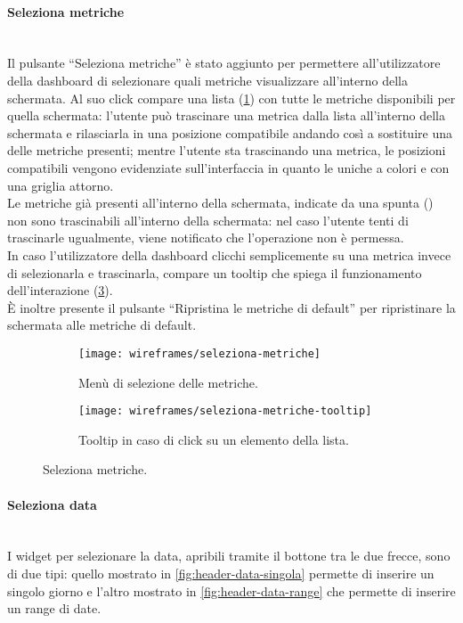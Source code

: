 \documentclass[../../../main.tex]{subfiles}
\begin{document}
\paragraph{Seleziona metriche}\mbox{}\\
Il pulsante ``Seleziona metriche'' è stato aggiunto per permettere all'utilizzatore della dashboard di selezionare quali metriche visualizzare all'interno della schermata. Al suo click compare una lista (\ref{fig:seleziona-metriche}) con tutte le metriche disponibili per quella schermata: l'utente può trascinare una metrica dalla lista all'interno della schermata e rilasciarla in una posizione compatibile andando così a sostituire una delle metriche presenti; mentre l'utente sta trascinando una metrica, le posizioni compatibili vengono evidenziate sull'interfaccia in quanto le uniche a colori e con una griglia attorno.\\
Le metriche già presenti all'interno della schermata, indicate da una spunta (\checkmark) non sono trascinabili all'interno della schermata: nel caso l'utente tenti di trascinarle ugualmente, viene notificato che l'operazione non è permessa.\\
In caso l'utilizzatore della dashboard clicchi semplicemente su una metrica invece di selezionarla e trascinarla, compare un tooltip che spiega il funzionamento dell'interazione (\ref{fig:seleziona-metriche-tooltip}).\\
\`E inoltre presente il pulsante ``Ripristina le metriche di default'' per ripristinare la schermata alle metriche di default.

\begin{figure}[H]
    \begin{subfigure}[b]{0.5\textwidth}
        \centering
        \texttt{[image: wireframes/seleziona-metriche]}
        \caption{Menù di selezione delle metriche.}
        \label{fig:seleziona-metriche}
    \end{subfigure}
\hfill
    \begin{subfigure}[b]{0.5\textwidth}
        \centering
        \texttt{[image: wireframes/seleziona-metriche-tooltip]}
        \caption{Tooltip in caso di click su un elemento della lista.}
        \label{fig:seleziona-metriche-tooltip}
    \end{subfigure}
    \caption{Seleziona metriche.}
\end{figure}


\paragraph{Seleziona data}\mbox{}\\
I widget per selezionare la data, apribili tramite il bottone tra le due frecce, sono di due tipi: quello mostrato in \ref{fig:header-data-singola} permette di inserire un singolo giorno e l'altro mostrato in \ref{fig:header-data-range} che permette di inserire un range di date.\\
\end{document}
